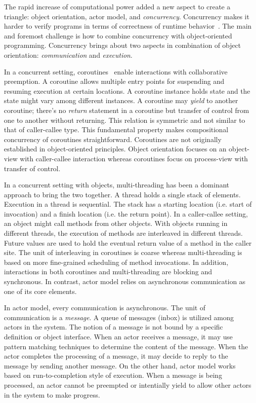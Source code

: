 The rapid increase of computational power added a new aspect to create a triangle: object orientation, actor model, and \emph{concurrency}.
Concurrency makes it harder to verify programs in terms of correctness of runtime behavior~\cite{Herlihy:1990:linear,johnsen:history,agha:predictive:safety}. 
The main and foremost challenge is how to combine concurrency with object-oriented programming.
Concurrency brings about two aspects in combination of object orientation: \emph{communication} and \emph{execution}.

In a concurrent setting, coroutines~\cite{conway1963design,taocp:knuth} enable interactions with collaborative preemption.
A coroutine allows multiple entry points for suspending and resuming execution at certain locations.
A coroutine instance holds state and the state might vary among different instances.
A coroutine may \emph{yield} to another coroutine;
there's no \emph{return} statement in a coroutine but transfer of control from one to another without returning.
This relation is symmetric and not similar to that of caller-callee type.
This fundamental property makes compositional concurrency of coroutines straightforward.
Coroutines are not originally established in object-oriented principles.
Object orientation focuses on an object-view with caller-callee interaction  whereas coroutines focus on process-view with transfer of control.

In a concurrent setting with objects, multi-threading has been a dominant approach to bring the two together.
A thread holds a single stack of elements.
Execution in a thread is sequential.
The stack has a starting location (i.e. start of invocation) and a finish location (i.e. the return point).
In a caller-callee setting, an object might call methods from other objects.
With objects running in different threads, the execution of methods are interleaved in different threads. 
Future values are used to hold the eventual return value of a method in the caller site.
The unit of interleaving in coroutines is coarse whereas multi-threading is based on more fine-grained scheduling of method invocations.
In addition, interactions in both coroutines and multi-threading are blocking and synchronous.
In contrast, actor model relies on asynchronous communication as one of its core elements.

In actor model, every communication is asynchronous.
The unit of communication is a \emph{message}.
A queue of messages (inbox) is utilized among actors in the system.
The notion of a message is not bound by a specific definition or object interface.
When an actor receives a message, it may use pattern matching techniques to determine the content of the message.
When the actor completes the processing of a message, it may decide to reply to the message by sending another message.
On the other hand, actor model works based on run-to-completion style of execution.
When a message is being processed, an actor cannot be preempted or intentially yield to allow other actors in the system to make progress.

